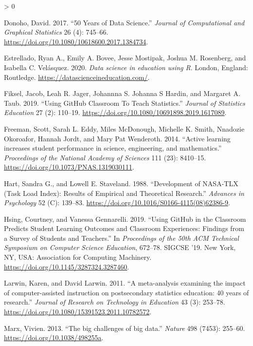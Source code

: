 \documentclass[
]{article}
\newlength{\cslhangindent}
\newenvironment{CSLReferences}[2] %
 {%
  \setlength{\parindent}{0pt}
  \ifodd #1 \everypar{\setlength{\hangindent}{\cslhangindent}}\ignorespaces\fi
  \ifnum #2 > 0
  \setlength{\parskip}{#2\baselineskip}
  \fi
 }%
 {}
\begin{document}
\begin{CSLReferences}{1}{0}
\leavevmode\hypertarget{ref-Donoho2017}{}%
Donoho, David. 2017. {``{50 Years of Data Science}.''} \emph{Journal of
Computational and Graphical Statistics} 26 (4): 745--66.
\url{https://doi.org/10.1080/10618600.2017.1384734}.

\leavevmode\hypertarget{ref-Estrellado2020}{}%
Estrellado, Ryan A., Emily A. Bovee, Jesse Mostipak, Joshua M.
Rosenberg, and Isabella C. Velásquez. 2020. \emph{{Data science in
education using R}}. London, England: Routledge.
\url{https://datascienceineducation.com/}.

\leavevmode\hypertarget{ref-Fiksel2019}{}%
Fiksel, Jacob, Leah R. Jager, Johannna S. Johanna S Hardin, and Margaret
A. Taub. 2019. {``{Using GitHub Classroom To Teach Statistics}.''}
\emph{Journal of Statistics Education} 27 (2): 110--19.
\url{https://doi.org/10.1080/10691898.2019.1617089}.

\leavevmode\hypertarget{ref-Freeman2014}{}%
Freeman, Scott, Sarah L. Eddy, Miles McDonough, Michelle K. Smith,
Nnadozie Okoroafor, Hannah Jordt, and Mary Pat Wenderoth. 2014.
{``{Active learning increases student performance in science,
engineering, and mathematics}.''} \emph{Proceedings of the National
Academy of Sciences} 111 (23): 8410--15.
\url{https://doi.org/10.1073/PNAS.1319030111}.

\leavevmode\hypertarget{ref-Hart1988}{}%
Hart, Sandra G., and Lowell E. Staveland. 1988. {``{Development of
NASA-TLX (Task Load Index): Results of Empirical and Theoretical
Research}.''} \emph{Advances in Psychology} 52 (C): 139--83.
\url{https://doi.org/10.1016/S0166-4115(08)62386-9}.

\leavevmode\hypertarget{ref-Hsing2019}{}%
Hsing, Courtney, and Vanessa Gennarelli. 2019. {``{Using GitHub in the
Classroom Predicts Student Learning Outcomes and Classroom Experiences:
Findings from a Survey of Students and Teachers}.''} In
\emph{Proceedings of the 50th ACM Technical Symposium on Computer
Science Education}, 672--78. SIGCSE '19. New York, NY, USA: Association
for Computing Machinery. \url{https://doi.org/10.1145/3287324.3287460}.

\leavevmode\hypertarget{ref-Larwin2011}{}%
Larwin, Karen, and David Larwin. 2011. {``{A meta-analysis examining the
impact of computer-assisted instruction on postsecondary statistics
education: 40 years of research}.''} \emph{Journal of Research on
Technology in Education} 43 (3): 253--78.
\url{https://doi.org/10.1080/15391523.2011.10782572}.

\leavevmode\hypertarget{ref-Marx2013}{}%
Marx, Vivien. 2013. {``{The big challenges of big data}.''}
\emph{Nature} 498 (7453): 255--60.
\url{https://doi.org/10.1038/498255a}.


\end{CSLReferences}
\end{document}
